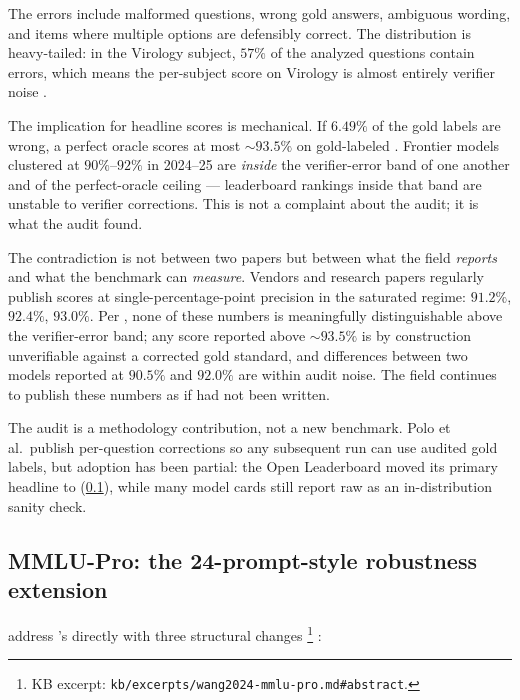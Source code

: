 The errors include malformed questions, wrong gold answers, ambiguous
wording, and items where multiple options are defensibly correct. The
distribution is heavy-tailed: in the Virology subject, $57\%$ of the
analyzed questions contain errors, which means the per-subject score
on Virology is almost entirely verifier noise
\citep[\S{}abstract]{mmlu-redux-2024}.

The implication for headline scores is mechanical. If $6.49\%$ of the
gold labels are wrong, a perfect oracle scores at most
$\sim 93.5\%$ on gold-labeled . Frontier models clustered at
$90\%\text{--}92\%$ in 2024--25 are \emph{inside} the verifier-error
band of one another and of the perfect-oracle ceiling --- leaderboard
rankings inside that band are unstable to verifier corrections. This
is not a complaint about the audit; it is what the audit found.

\begin{contradiction}
The contradiction is not between two papers but between what the field
\emph{reports} and what the benchmark can \emph{measure}. Vendors and
research papers regularly publish  scores at single-percentage-point
precision in the saturated regime: \(91.2\%\), \(92.4\%\), \(93.0\%\).
Per \citet{mmlu-redux-2024}, none of these numbers is meaningfully
distinguishable above the verifier-error band; any score reported
above $\sim 93.5\%$ is by construction unverifiable against a corrected
gold standard, and differences between two models reported at $90.5\%$
and $92.0\%$ are within audit noise. The field continues to publish
these numbers as if  had not been written.
\end{contradiction}

The audit is a methodology contribution, not a new benchmark. Polo et
al.\ publish per-question corrections so any subsequent run can use
audited gold labels, but adoption has been partial: the Open 
Leaderboard moved its primary headline to 
(\cref{sec:knowledge-mmlu-pro}), while many model cards still report
raw  as an in-distribution sanity check.

\subsection{MMLU-Pro: the 24-prompt-style robustness extension}
\label{sec:knowledge-mmlu-pro}

\citet{wang2024-mmlu-pro} address 's  directly with three
structural changes%
\footnote{KB excerpt: \texttt{kb/excerpts/wang2024-mmlu-pro.md\#abstract}.}
\citep[\S{}abstract]{wang2024-mmlu-pro}:

